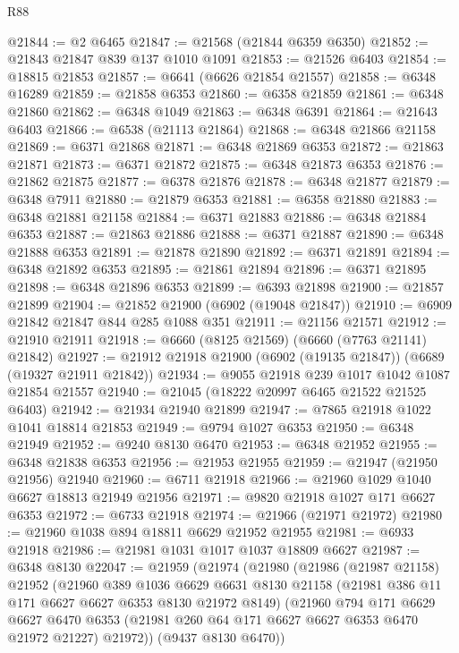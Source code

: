 \begin{lexlean}{R88}
\begin{coremodule}
@21844 := @2 @6465
@21847 := @21568 (@21844 @6359 @6350)
@21852 := @21843 @21847 @839 @137 @1010 @1091
@21853 := @21526 @6403
@21854 := @18815 @21853
@21857 := @6641 (@6626 @21854 @21557)
@21858 := @6348 @16289
@21859 := @21858 @6353
@21860 := @6358 @21859
@21861 := @6348 @21860
@21862 := @6348 @1049
@21863 := @6348 @6391
@21864 := @21643 @6403
@21866 := @6538 (@21113 @21864)
@21868 := @6348 @21866 @21158
@21869 := @6371 @21868
@21871 := @6348 @21869 @6353
@21872 := @21863 @21871
@21873 := @6371 @21872
@21875 := @6348 @21873 @6353
@21876 := @21862 @21875
@21877 := @6378 @21876
@21878 := @6348 @21877
@21879 := @6348 @7911
@21880 := @21879 @6353
@21881 := @6358 @21880
@21883 := @6348 @21881 @21158
@21884 := @6371 @21883
@21886 := @6348 @21884 @6353
@21887 := @21863 @21886
@21888 := @6371 @21887
@21890 := @6348 @21888 @6353
@21891 := @21878 @21890
@21892 := @6371 @21891
@21894 := @6348 @21892 @6353
@21895 := @21861 @21894
@21896 := @6371 @21895
@21898 := @6348 @21896 @6353
@21899 := @6393 @21898
@21900 := @21857 @21899
@21904 := @21852 @21900 (@6902 (@19048 @21847))
@21910 := @6909 @21842 @21847 @844 @285 @1088 @351
@21911 := @21156 @21571
@21912 := @21910 @21911
@21918 := @6660 (@8125 @21569) (@6660 (@7763 @21141) @21842)
@21927 := @21912 @21918 @21900 (@6902 (@19135 @21847)) (@6689 (@19327 @21911 @21842))
@21934 := @9055 @21918 @239 @1017 @1042 @1087 @21854 @21557
@21940 := @21045 (@18222 @20997 @6465 @21522 @21525 @6403)
@21942 := @21934 @21940 @21899
@21947 := @7865 @21918 @1022 @1041 @18814 @21853
@21949 := @9794 @1027 @6353
@21950 := @6348 @21949
@21952 := @9240 @8130 @6470
@21953 := @6348 @21952
@21955 := @6348 @21838 @6353
@21956 := @21953 @21955
@21959 := @21947 (@21950 @21956) @21940
@21960 := @6711 @21918
@21966 := @21960 @1029 @1040 @6627 @18813 @21949 @21956
@21971 := @9820 @21918 @1027 @171 @6627 @6353
@21972 := @6733 @21918
@21974 := @21966 (@21971 @21972)
@21980 := @21960 @1038 @894 @18811 @6629 @21952 @21955
@21981 := @6933 @21918
@21986 := @21981 @1031 @1017 @1037 @18809 @6627
@21987 := @6348 @8130
@22047 := @21959
    (@21974
      (@21980
        (@21986
          (@21987 @21158)
          @21952
          (@21960
            @389
            @1036
            @6629
            @6631
            @8130
            @21158
            (@21981 @386 @11 @171 @6627 @6627 @6353 @8130 @21972 @8149)
            (@21960
              @794
              @171
              @6629
              @6627
              @6470
              @6353
              (@21981 @260 @64 @171 @6627 @6627 @6353 @6470 @21972 @21227)
              @21972))
          (@9437 @8130 @6470))

\end{coremodule}
\end{lexlean}
